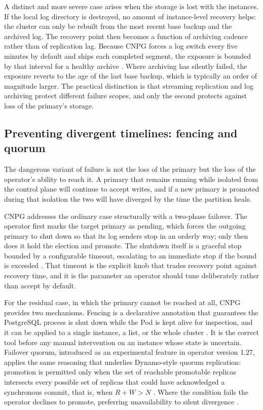 \documentclass[11pt,a4paper]{article}
\begin{document}
A distinct and more severe case arises when the storage is lost with the instances. If the local log directory is destroyed, no amount of instance-level recovery helps: the cluster can only be rebuilt from the most recent base backup and the archived log. The recovery point then becomes a function of archiving cadence rather than of replication lag. Because CNPG forces a log switch every five minutes by default and ships each completed segment, the exposure is bounded by that interval for a healthy archive \cite{cnpg-api}. Where archiving has silently failed, the exposure reverts to the age of the last base backup, which is typically an order of magnitude larger. The practical distinction is that streaming replication and log archiving protect different failure scopes, and only the second protects against loss of the primary's storage.

\subsection{Preventing divergent timelines: fencing and quorum}

The dangerous variant of failure is not the loss of the primary but the loss of the operator's ability to reach it. A primary that remains running while isolated from the control plane will continue to accept writes, and if a new primary is promoted during that isolation the two will have diverged by the time the partition heals.

CNPG addresses the ordinary case structurally with a two-phase failover. The operator first marks the target primary as pending, which forces the outgoing primary to shut down so that its log senders stop in an orderly way; only then does it hold the election and promote. The shutdown itself is a graceful stop bounded by a configurable timeout, escalating to an immediate stop if the bound is exceeded \cite{cnpg-failover}. That timeout is the explicit knob that trades recovery point against recovery time, and it is the parameter an operator should tune deliberately rather than accept by default.

For the residual case, in which the primary cannot be reached at all, CNPG provides two mechanisms. Fencing is a declarative annotation that guarantees the PostgreSQL process is shut down while the Pod is kept alive for inspection, and it can be applied to a single instance, a list, or the whole cluster \cite{cnpg-fencing}. It is the correct tool before any manual intervention on an instance whose state is uncertain. Failover quorum, introduced as an experimental feature in operator version 1.27, applies the same reasoning that underlies Dynamo-style quorum replication: promotion is permitted only when the set of reachable promotable replicas intersects every possible set of replicas that could have acknowledged a synchronous commit, that is, when $R + W > N$ \cite{cnpg-failover,decandia-dynamo,attiya-quorum}. Where the condition fails the operator declines to promote, preferring unavailability to silent divergence \cite{bailis-hat}.
\end{document}
